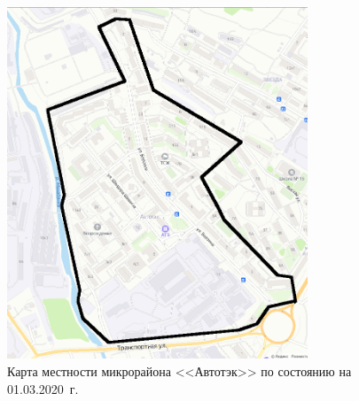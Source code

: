 \begin{figure}[h!]
  \begin{center}
    \includegraphics[width=0.8\textwidth]{authors/kodirev-fig-2.png}
  \end{center}
  \caption{Карта местности микрорайона <<Автотэк>> по состоянию на 01.03.2020~г.}
  \label{fig:kodirev-fig-2}
\end{figure}
